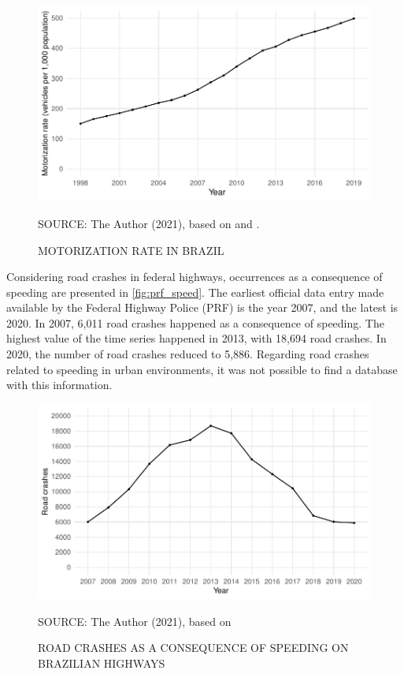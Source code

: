 \begin{figure}[!htbp]
    \centering\footnotesize
    \captionsetup{font=footnotesize}
    \caption{MOTORIZATION RATE IN BRAZIL}
    \includegraphics{fig/brazil_motor.pdf}
    \label{fig:br_motor}
    \par SOURCE: The Author (2021), based on \textcite{MinistryofHealth2021} and \textcite{DENATRAN2020}.
\end{figure} 

Considering road crashes in federal highways, occurrences as a consequence of speeding are presented in \autoref{fig:prf_speed}. The earliest official data entry made available by the Federal Highway Police (PRF) is the year 2007, and the latest is 2020. In 2007, 6,011 road crashes happened as a consequence of speeding. The highest value of the time series happened in 2013, with 18,694 road crashes. In 2020, the number of road crashes reduced to 5,886. Regarding road crashes related to speeding in urban environments, it was not possible to find a database with this information. 

\begin{figure}[!htbp]
    \centering\footnotesize
    \captionsetup{font=footnotesize}
    \caption{ROAD CRASHES AS A CONSEQUENCE OF SPEEDING ON BRAZILIAN HIGHWAYS}
    \includegraphics{fig/prf_plot.pdf}
    \label{fig:prf_speed}
    \par SOURCE: The Author (2021), based on \textcite{PRF2021b}
\end{figure}


